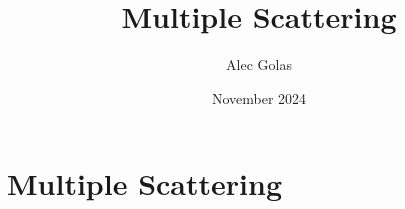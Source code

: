 \documentclass{article}
\title{Multiple Scattering}
\author{Alec Golas}
\date{November 2024}
\begin{document}


\section{Multiple Scattering}
\label{sec:multiple-scattering}

\end{document}
